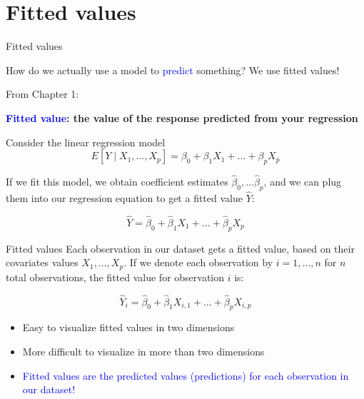 \documentclass[10pt,t]{beamer}
\begin{document}
\section{Fitted values}

\begin{frame}{Fitted values}
	
	\vspace{-5 mm}
	
	How do we actually use a model to  \textcolor{blue}{predict} something? We use fitted values!
	
	\vspace{0.3cm}
	
	From Chapter 1:
	
	\vspace{0.3cm}
	
	\textbf{\textcolor{blue}{Fitted value}: the value of the response predicted from your regression}
	
	\vspace{0.3cm}
	
	Consider the linear regression model
	$$
	E[Y \mid X_1, \dots, X_p] = \beta_0 + \beta_1 X_1 + \dots + \beta_p X_p
	$$
	\smallskip
	
	If we fit this model, we obtain coefficient estimates $\hat{\beta}_0, \dots \hat{\beta}_p$, and we can plug them into our regression equation to get a fitted value $\hat{Y}$:
	
	\medskip
	$$
	\hat{Y} = \hat{\beta}_0 + \hat{\beta}_1 X_1 + \dots + \hat{\beta}_p X_p
	$$
	
	
\end{frame}

\begin{frame}{Fitted values}
Each observation in our dataset gets a fitted value, based on their covariates values $X_1, \dots, X_p$. If we denote each observation by $i = 1, \dots, n$ for $n$ total observations, the fitted value for observation $i$ is:
\medskip

$$
\hat{Y}_i = \hat{\beta}_0 + \hat{\beta}_1 X_{i, 1} + \dots + \hat{\beta}_p X_{i, p}
$$

\medskip

\begin{itemize}
\item Easy to visualize fitted values in two dimensions
\medskip

\item More difficult to visualize in more than two dimensions
\medskip

\item \textcolor{blue}{Fitted values  are the predicted values (predictions) for each observation in our dataset!}
\end{itemize}
\end{frame}
\end{document}
